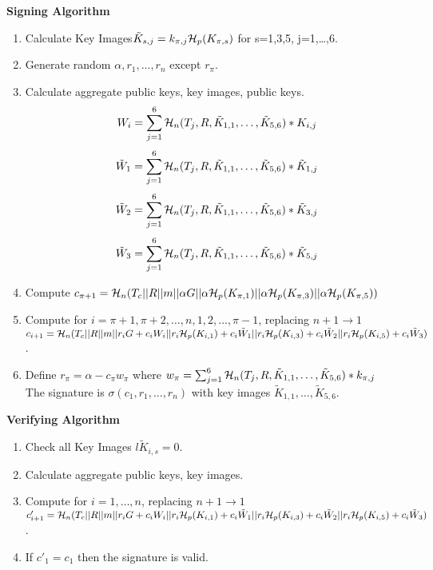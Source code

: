     \textbf{Signing Algorithm}
    \begin{enumerate}
        \item Calculate Key Images$\tilde{K}_{s,j}=k_{\pi,j}{\cal H}_{p} (K_{\pi,s})$ for s=1,3,5, j=1,\ldots,6.
        \item Generate random $\alpha,r_{1},\ldots,r_{n}$ except $r_{\pi}$.
        \item Calculate aggregate public keys, key images, public keys.
         $$ W_{i}= \sum^{6}_{j=1} {\cal H}_{n}(T_{j},R,\tilde{K}_{1,1},\ldots,\tilde{K}_{5,6})*K_{i,j} $$
        $$ \tilde{W}_{1}= \sum^{6}_{j=1} {\cal H}_{n}(T_{j},R,\tilde{K}_{1,1},\ldots,\tilde{K}_{5,6})*\tilde{K}_{1,j} $$
        $$ \tilde{W}_{2}= \sum^{6}_{j=1} {\cal H}_{n}(T_{j},R,\tilde{K}_{1,1},\ldots,\tilde{K}_{5,6})*\tilde{K}_{3,j} $$
        $$ \tilde{W}_{3}= \sum^{6}_{j=1} {\cal H}_{n}(T_{j},R,\tilde{K}_{1,1},\ldots,\tilde{K}_{5,6})*\tilde{K}_{5,j} $$
        \item Compute $c_{\pi+1}={\cal H}_{n}(T_{c}||R||m||\alpha G||\alpha {\cal H}_{p}(K_{\pi,1})||\alpha {\cal H}_{p}(K_{\pi,3})||\alpha {\cal H}_{p}(K_{\pi,5})) $
        \item Compute for $i=\pi +1,\pi +2,\ldots,n,1,2,\ldots,\pi -1$, replacing $n+1 \rightarrow 1$\\
        $c_{i+1}={\cal H}_{n}(T_{c}||R||m||r_{i}G+c_{i}W_{i}||r_{i}{\cal H}_{p}(K_{i,1})+c_{i} \tilde{W}_{1}||r_{i}{\cal H}_{p}(K_{i,3})+c_{i} \tilde{W}_{2}||r_{i}{\cal H}_{p}(K_{i,5})+c_{i} \tilde{W}_{3}) $.
        \item Define $r_{\pi}=\alpha - c_{\pi} w_{\pi}$ where $w_{\pi}=\sum^{6}_{j=1} {\cal H}_{n}(T_{j},R,\tilde{K}_{1,1},\ldots,\tilde{K}_{5,6})*k_{\pi,j}$\\
        The signature is $\sigma (c_{1},r_{1},\ldots,r_{n})$ with key images $\tilde{K}_{1,1},\ldots,\tilde{K}_{5,6}$.
    \end{enumerate}
    
    \textbf{Verifying Algorithm}
    \begin{enumerate}
        \item Check all Key Images $l\tilde{K}_{i,s}=0$.
        \item Calculate aggregate public keys, key images.
        \item Compute for $i=1,\ldots,n$, replacing $n+1 \rightarrow 1$\\
        $c'_{i+1}={\cal H}_{n}(T_{c}||R||m||r_{i}G+c_{i}W_{i}||r_{i}{\cal H}_{p}(K_{i,1})+c_{i} \tilde{W}_{1}||r_{i}{\cal H}_{p}(K_{i,3})+c_{i} \tilde{W}_{2}||r_{i}{\cal H}_{p}(K_{i,5})+c_{i} \tilde{W}_{3}) $.
        \item If $c'_{1}=c_{1}$ then the signature is valid.
    \end{enumerate}

